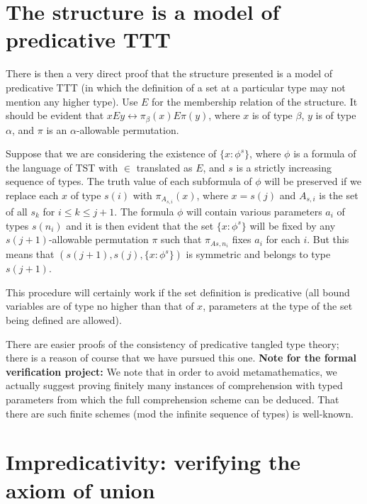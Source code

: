 \section{The structure is a model of predicative TTT}

There is then a very direct proof that the structure presented is a model of predicative TTT (in which the definition of a set at a particular type may not mention any higher type).  Use $E$ for the membership relation of the structure.  It should be evident that $x E y \leftrightarrow \pi_\beta(x) E \pi(y)$,
where $x$ is of type $\beta$, $y$ is of type $\alpha$, and $\pi$ is an $\alpha$-allowable permutation.

Suppose that we are considering the existence of $\{x : \phi^s\}$, where $\phi$ is a formula of the language of TST with $\in$ translated as $E$, and $s$ is a strictly increasing sequence of types.  The truth value of each subformula of $\phi$ will be preserved if we replace each $x$ of type $s(i)$ with $\pi_{A_{s,i}}(x)$, where
$x=s(j)$ and $A_{s,i}$ is the set of all $s_k$ for $i \leq k \leq j+1$.  The formula $\phi$ will contain various parameters $a_i$ of types $s(n_i)$ and it is then evident that the set $\{x : \phi^s\}$ will be fixed by any $s(j+1)$-allowable permutation $\pi$ such that $\pi_{A{s,n_i}}$ fixes $a_i$ for each $i$.  But this means that
$(s(j+1),s(j),\{x : \phi^s\})$ is symmetric and belongs to type $s(j+1)$.

This procedure will certainly work if the set definition is predicative (all bound variables are of type no higher than that of $x$, parameters at the type
of the set being defined are allowed).

There are easier proofs of the consistency of predicative tangled type theory;  there is a reason of course that we have pursued this one.
{\bf Note for the formal verification project:}  We note that in order to avoid metamathematics, we actually suggest proving finitely many instances of comprehension with typed parameters from which the full comprehension scheme can be deduced.  That there are such finite schemes (mod the infinite sequence of types) is well-known.

\newpage
\section{Impredicativity:  verifying the axiom of union}

